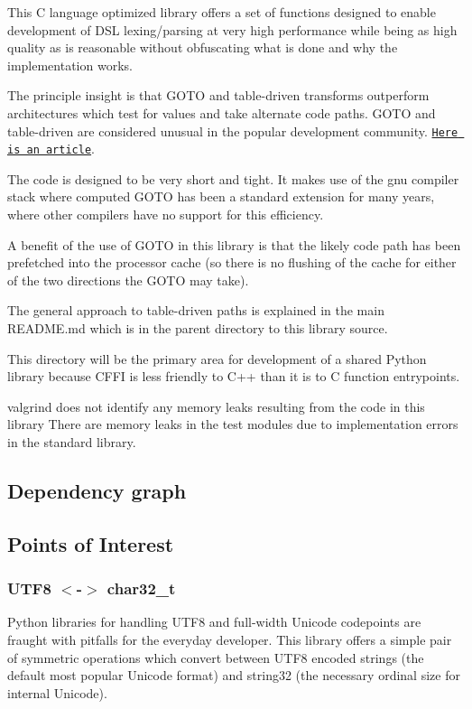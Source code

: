 This C language optimized library offers a set of functions designed to enable development of D\+S\+L lexing/parsing at very high performance while being as high quality as is reasonable without obfuscating what is done and why the implementation works.

The principle insight is that G\+O\+T\+O and table-\/driven transforms outperform architectures which test for values and take alternate code paths. G\+O\+T\+O and table-\/driven are considered unusual in the popular development community. \href{http://eli.thegreenplace.net/2012/07/12/computed-goto-for-efficient-dispatch-tables}{\tt Here is an article}.

The code is designed to be very short and tight. It makes use of the gnu compiler stack where computed G\+O\+T\+O has been a standard extension for many years, where other compilers have no support for this efficiency.

A benefit of the use of G\+O\+T\+O in this library is that the likely code path has been prefetched into the processor cache (so there is no flushing of the cache for either of the two directions the G\+O\+T\+O may take).

The general approach to table-\/driven paths is explained in the main R\+E\+A\+D\+M\+E.\+md which is in the parent directory to this library source.

This directory will be the primary area for development of a shared Python library because C\+F\+F\+I is less friendly to C++ than it is to C function entrypoints.

valgrind does not identify any memory leaks resulting from the code in this library There are memory leaks in the test modules due to implementation errors in the standard library.

\subsection*{Dependency graph}



\subsection*{Points of Interest}

\subsubsection*{U\+T\+F8 $<$-\/$>$ char32\+\_\+t}

Python libraries for handling U\+T\+F8 and full-\/width Unicode codepoints are fraught with pitfalls for the everyday developer. This library offers a simple pair of symmetric operations which convert between U\+T\+F8 encoded strings (the default most popular Unicode format) and string32 (the necessary ordinal size for internal Unicode).

